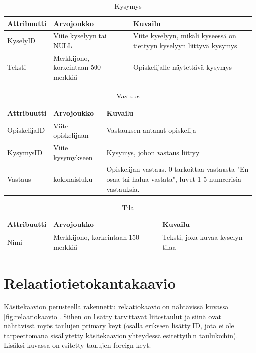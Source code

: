 \documentclass[12pt,a4paper,titlepage]{article}
\begin{document}
\begin{table}[h!]
\caption{Kysymys}
\begin{tabularx}{\textwidth}{ |  l X X  |}
  \hline
  Attribuutti & Arvojoukko & Kuvailu \\
  \hline
  KyselyID & Viite kyselyyn tai NULL & Viite kyselyyn, mikäli kyseessä on tiettyyn kyselyyn liittyvä kysymys \\
  Teksti & Merkkijono, korkeintaan 500 merkkiä & Opiskelijalle näytettävä kysymys \\
  \hline
\end{tabularx}
\end{table}

\begin{table}[h!]
\caption{Vastaus}
\begin{tabularx}{\textwidth}{ |  l X X  |}
  \hline
  Attribuutti & Arvojoukko & Kuvailu \\
  \hline
  OpiskelijaID & Viite opiskelijaan & Vastauksen antanut opiskelija \\
  KysymysID & Viite kysymykseen & Kysymys, johon vastaus liittyy \\
  Vastaus & kokonaisluku & Opiskelijan vastaus. 0 tarkoittaa vastausta "En osaa tai halua vastata", luvut 1-5 numeerisia vastauksia. \\
  \hline
\end{tabularx}
\end{table}

\begin{table}[h!]
\caption{Tila} \label{tietokohde_viimeinen}
\begin{tabularx}{\textwidth}{ |  l X X  |}
  \hline
  Attribuutti & Arvojoukko & Kuvailu \\
  \hline
  Nimi & Merkkijono, korkeintaan 150 merkkiä & Teksti, joka kuvaa kyselyn tilaa\\
  \hline
\end{tabularx}
\end{table}

\section{Relaatiotietokantakaavio}
Käsitekaavion perusteella rakennettu relaatiokaavio on nähtävissä kuvassa \ref{fig:relaatiokaavio}. Siihen on lisätty tarvittavat liitostaulut ja siinä ovat nähtävissä myös taulujen primary keyt (osalla erikseen lisätty ID, jota ei ole tarpeettomana sisällytetty käsitekaavion yhteydessä esitettyihin taulukoihin). Lisäksi kuvassa on esitetty taulujen foreign keyt.
\end{document}
